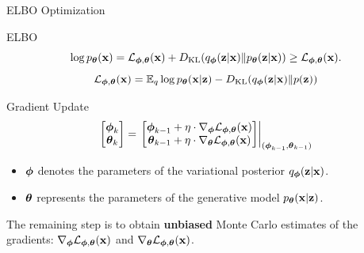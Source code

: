\documentclass{beamer}
\renewcommand{\eqpause}{}
\begin{document}
\begin{frame}{ELBO Optimization}
	\begin{block}{ELBO}
		\vspace{-0.3cm}
		\[
			\log \pt(\bx) = \cL_{\bphi, \btheta}(\bx) + \KL(q_{\bphi}(\bz| \bx) \| \pt(\bz|\bx)) \geq \cL_{\bphi, \btheta}(\bx).
		\]
		\[
		 	\cL_{\bphi, \btheta}(\bx) = \bbE_{q} \log \pt(\bx | \bz) - \KL(q_{\bphi}(\bz| \bx) \| p(\bz))
		\]
		\vspace{-0.5cm}
	\end{block}
	\eqpause
	\begin{block}{Gradient Update}
		\[
			\begin{bmatrix}
				\bphi_k \\
				\btheta_k
			\end{bmatrix}
			= \left.
			\begin{bmatrix}
				\bphi_{k-1} + \eta \cdot \nabla_{\bphi} \cL_{\bphi, \btheta}(\bx) \\
				\btheta_{k-1} + \eta \cdot \nabla_{\btheta} \cL_{\bphi, \btheta}(\bx)
			\end{bmatrix}
			\right|_{(\bphi_{k-1}, \btheta_{k-1})}
		\]
		\begin{itemize}
			\item $\bphi$ denotes the parameters of the variational posterior $q_{\bphi}(\bz| \bx)$.
			\item $\btheta$ represents the parameters of the generative model $\pt(\bx | \bz)$.
		\end{itemize}
	\end{block}
	\eqpause
	The remaining step is to obtain \textbf{unbiased} Monte Carlo estimates of the gradients: $\nabla_{\bphi} \cL_{\bphi, \btheta}(\bx)$ and $\nabla_{\btheta} \cL_{\bphi, \btheta}(\bx)$. 
\end{frame}
\end{document}
